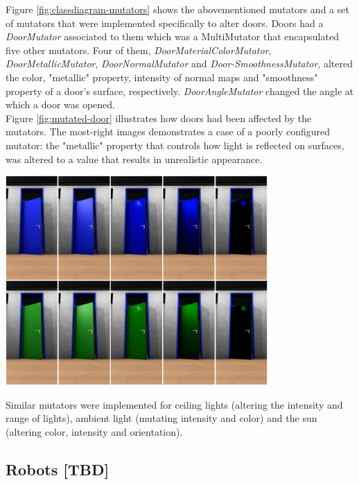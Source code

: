 Figure \ref{fig:classdiagram-mutators} shows the abovementioned mutators and a set of mutators that were implemented specifically to alter doors. Doors had a \textit{DoorMutator} associated to them which was a MultiMutator that encapsulated five other mutators. Four of them, \textit{DoorMaterialColorMutator}, \textit{DoorMetallicMutator}, \textit{DoorNormalMutator} and \textit{Door-SmoothnessMutator}, altered the color, "metallic" property, intensity of normal maps and "smoothness" property of a door's surface, respectively. \textit{DoorAngleMutator} changed the angle at which a door was opened.\\
Figure \ref{fig:mutated-door} illustrates how doors had been affected by the mutators. The most-right images demonstrates a case of a poorly configured mutator: the "metallic" property that controls how light is reflected on surfaces, was altered to a value that results in unrealistic appearance.
\begin{center}
\noindent\includegraphics[width=10cm]{tex/img/ch05/Results_Door.png}
\label{fig:mutated-door}
\end{center}
Similar mutators were implemented for ceiling lights (altering the intensity and range of lights), ambient light (mutating intensity and color) and the sun (altering color, intensity and orientation).

\subsection{Robots [TBD]}
